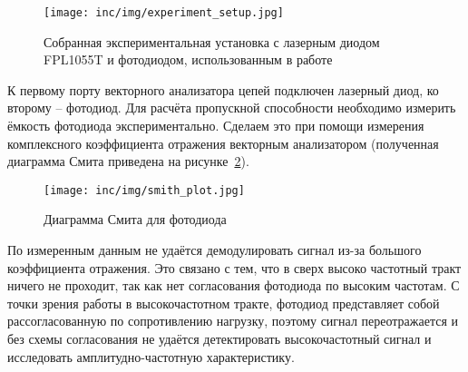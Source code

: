 \begin{figure}[!h]
    \centering
    \texttt{[image: inc/img/experiment\_setup.jpg]}
    \caption{Собранная экспериментальная установка с лазерным диодом FPL1055T и фотодиодом, использованным в работе~\cite{Kozyreva2019}}
    \label{fig:experiment_setup_photo}
\end{figure}

К первому порту векторного анализатора цепей подключен лазерный диод, ко второму \--- фотодиод. Для расчёта пропускной способности необходимо измерить ёмкость фотодиода экспериментально. Сделаем это при помощи измерения комплексного коэффициента отражения векторным анализатором (полученная диаграмма Смита приведена на рисунке~\ref{fig:smith_plot}).

\begin{figure}[!h]
    \centering
    \texttt{[image: inc/img/smith\_plot.jpg]}
    \caption{Диаграмма Смита для фотодиода}
    \label{fig:smith_plot}
\end{figure}

По измеренным данным не удаётся демодулировать сигнал из-за большого коэффициента отражения. Это связано с тем, что в сверх высоко частотный тракт ничего не проходит, так как нет согласования фотодиода по высоким частотам. С точки зрения работы в высокочастотном тракте, фотодиод представляет собой рассогласованную по сопротивлению нагрузку, поэтому сигнал переотражается и без схемы согласования не удаётся детектировать высокочастотный сигнал и исследовать амплитудно-частотную характеристику.